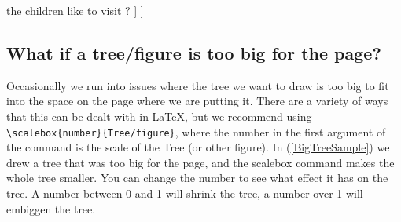 \documentclass{article}
\begin{document}
\ea \label{LinearExample}

    the children  like to visit  ? ] ] %
\z

\vspace{2em} 

\subsection{What if a tree/figure is too big for the page?}

Occasionally we run into issues where the tree we want to draw is too big to fit into the space on the page where we are putting it. There are a variety of ways that this can be dealt with in \LaTeX{}, but we recommend using \verb|\scalebox{number}{Tree/figure}|, where the number in the first argument of the command is the scale of the Tree (or other figure). In (\ref{BigTreeSample}) we drew a tree that was too big for the page, and the scalebox command makes the whole tree smaller. You can change the number to see what effect it has on the tree. A number between 0 and 1 will shrink the tree, a number over 1 will embiggen the tree. %

\ea \label{BigTreeSample}
\z 
\end{document}
